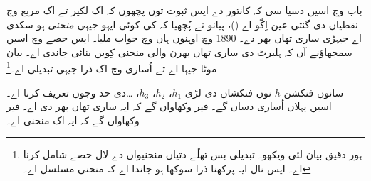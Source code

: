 \documentclass[../../../include/open-logic-section]{subfiles}
\begin{document}


باب  وچ اسیں دسیا سی کہ کانتور دے ایس ثبوت توں پچھوں کہ اک لکیر تے اک مربع وچ نقطیاں دی گنتی عین اِکّو اے ()، پیانو نے پُچھیا کہ کی کوئی ایہو جیہی \emph{منحنی} ہو سکدی اے جیہڑی ساری تھاں بھر دے۔ 1890 وچ اوہنوں ہاں وچ جواب ملیا۔ ایس حصے وچ اسیں سمجھاؤنے آں کہ ہلبرٹ دی ساری تھاں بھرن والی منحنی کِویں بنائی جاندی اے۔ بیان موٹا جیہا اے تے اُساری وچ اک ذرا جیہی تبدیلی اے۔\footnote{ہور دقیق بیان لئی \cite{Rose2010} ویکھو۔ تبدیلی بس تھلّے دتیاں منحنیواں دے لال حصے شامل کرنا اے۔ ایس نال ایہ پرکھنا ذرا سوکھا ہو جاندا اے کہ منحنی مسلسل اے۔}

سانوں فنکشن $h$ نوں فنکشاں دی لڑی $h_1$، $h_2$، $h_3$، \dots\@ دی حد وجوں تعریف کرنا اے۔ اسیں پہلاں اُساری دساں گے۔ فیر وکھاواں گے کہ ایہ ساری تھاں بھر دی اے۔ فیر وکھاواں گے کہ ایہ اک منحنی اے۔
\end{document}
